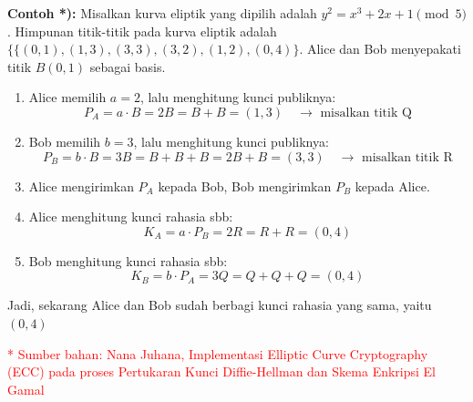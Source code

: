 \documentclass{article}
\begin{document}

\textbf{Contoh *):} Misalkan kurva eliptik yang dipilih adalah $y^2 = x^3 + 2x + 1 \pmod 5$. Himpunan titik-titik pada kurva eliptik adalah $\{\{(0, 1), (1, 3), (3, 3), (3, 2), (1, 2), (0, 4)\}$. Alice dan Bob menyepakati titik $B(0, 1)$ sebagai basis.

\begin{enumerate}
    \item Alice memilih $a = 2$, lalu menghitung kunci publiknya:
    \[ P_A = a \cdot B = 2B = B + B = (1, 3) \quad \rightarrow \text{ misalkan titik Q} \]
    \item Bob memilih $b = 3$, lalu menghitung kunci publiknya:
    \[ P_B = b \cdot B = 3B = B + B + B = 2B + B = (3, 3) \quad \rightarrow \text{ misalkan titik R} \]
    \item Alice mengirimkan $P_A$ kepada Bob, Bob mengirimkan $P_B$ kepada Alice.
    \item Alice menghitung kunci rahasia sbb:
    \[ K_A = a \cdot P_B = 2R = R + R = (0, 4) \]
    \item Bob menghitung kunci rahasia sbb:
    \[ K_B = b \cdot P_A = 3Q = Q + Q + Q = (0, 4) \]
\end{enumerate}

Jadi, sekarang Alice dan Bob sudah berbagi kunci rahasia yang sama, yaitu $(0, 4)$

\vspace{10mm}
\textcolor{red}{* Sumber bahan: Nana Juhana, Implementasi Elliptic Curve Cryptography (ECC) pada proses Pertukaran Kunci Diffie-Hellman dan Skema Enkripsi El Gamal}
\end{document}
